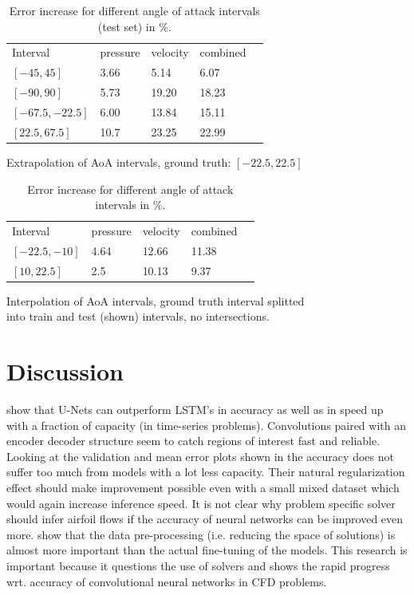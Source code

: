 \documentclass[acmtog]{techreportacmart}
\begin{document}
\begin{table}
	\caption{Error increase for different angle of attack intervals (test set) in \%.}
\label{tab:gen1}
\begin{center}
\begin{tabular}{l|l|l|l|l}
  \toprule
  Interval   		& pressure   &	velocity    & combined \\
  $[-45, 45]$	 	& 3.66	  & 5.14		& 6.07	   \\
  $[-90, 90]$	 	& 5.73	  & 19.20		& 18.23	   \\
  $[-67.5, -22.5]$ 	& 6.00	  & 13.84		& 15.11	   \\
  $[22.5, 67.5]$  	& 10.7	  & 23.25		& 22.99	   \\
  \bottomrule
\end{tabular}
\end{center}
\bigskip\centering
	\footnotesize Extrapolation of AoA intervals, ground truth: $[-22.5, 22.5]$ \\
\end{table}%

\begin{table}
\caption{Error increase for different angle of attack intervals in \%.}
\label{tab:gen2}
\begin{center}
\begin{tabular}{l|l|l|l|l}
  \toprule
  Interval   	& pressure   &	velocity    & combined \\
  $[-22.5, -10]$ 	& 4.64	  & 12.66		& 11.38	   \\
  $[10, 22.5]$	 	& 2.5	  & 10.13		& 9.37	   \\
  \bottomrule
\end{tabular}
\end{center}
\bigskip\centering
\footnotesize Interpolation of AoA intervals, ground truth interval splitted \\
	into train and test (shown) intervals, no intersections.  
\end{table}%

\section{Discussion}
\cite{Fotiadis2020} show that U-Nets can outperform LSTM's in accuracy as well as in speed 
up with a fraction of capacity (in time-series problems). Convolutions paired with an encoder 
decoder structure seem to catch regions of interest fast and reliable. Looking at the validation 
and mean error plots shown in \cite{Thuerey20} the accuracy does not suffer too much from models 
with a lot less capacity. Their natural regularization effect should make improvement possible 
even with a small mixed dataset which would again increase inference speed. It is not clear 
why problem specific solver should infer airfoil flows if the accuracy of neural networks 
can be improved even more. \cite{Thuerey20} show that the data pre-processing (i.e. reducing 
the space of solutions) is almost more important than the actual fine-tuning of the models. 
This research is important because it questions the use of solvers and shows the rapid progress 
wrt. accuracy of convolutional neural networks in CFD problems.
\end{document}
